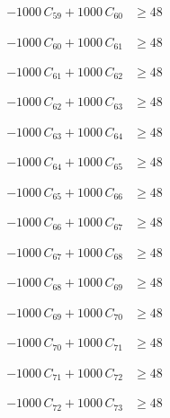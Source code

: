 \documentclass[a4paper,11pt]{article}
\begin{document}
\begin{align}
-1000\,C_{59} + 1000\,C_{60} &\geq 48 \nonumber
\end{align}

\begin{align}
-1000\,C_{60} + 1000\,C_{61} &\geq 48 \nonumber
\end{align}

\begin{align}
-1000\,C_{61} + 1000\,C_{62} &\geq 48 \nonumber
\end{align}

\begin{align}
-1000\,C_{62} + 1000\,C_{63} &\geq 48 \nonumber
\end{align}

\begin{align}
-1000\,C_{63} + 1000\,C_{64} &\geq 48 \nonumber
\end{align}

\begin{align}
-1000\,C_{64} + 1000\,C_{65} &\geq 48 \nonumber
\end{align}

\begin{align}
-1000\,C_{65} + 1000\,C_{66} &\geq 48 \nonumber
\end{align}

\begin{align}
-1000\,C_{66} + 1000\,C_{67} &\geq 48 \nonumber
\end{align}

\begin{align}
-1000\,C_{67} + 1000\,C_{68} &\geq 48 \nonumber
\end{align}

\begin{align}
-1000\,C_{68} + 1000\,C_{69} &\geq 48 \nonumber
\end{align}

\begin{align}
-1000\,C_{69} + 1000\,C_{70} &\geq 48 \nonumber
\end{align}

\begin{align}
-1000\,C_{70} + 1000\,C_{71} &\geq 48 \nonumber
\end{align}

\begin{align}
-1000\,C_{71} + 1000\,C_{72} &\geq 48 \nonumber
\end{align}

\begin{align}
-1000\,C_{72} + 1000\,C_{73} &\geq 48 \nonumber
\end{align}
\end{document}
